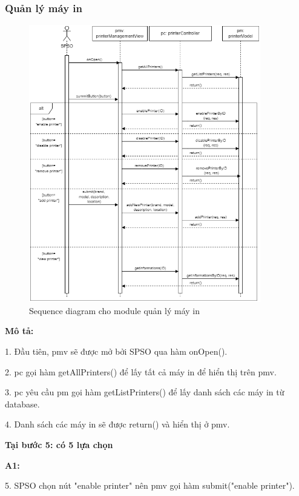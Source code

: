 \subsubsection{Quản lý máy in}
\begin{figure}[H]
    \begin{center}
        \includegraphics[width=0.9\textwidth]{Images/System Modelling/PM_Sequence.png}
        \caption{Sequence diagram cho module quản lý máy in}
        \label{fig:arch}
    \end{center}
\end{figure}
\textbf{Mô tả:}\par
1. Đầu tiên, pmv sẽ được mở bởi SPSO qua hàm onOpen().\par
2. pc gọi hàm getAllPrinters() để lấy tất cả máy in để hiển thị trên pmv. \par
3. pc yêu cầu pm gọi hàm getListPrinters() để lấy danh sách các máy in từ database. \par
4. Danh sách các máy in sẽ được return() và hiển thị ở pmv. \par
\textbf{Tại bước 5: có 5 lựa chọn}\par
\textbf{A1:}\par
5. SPSO chọn nút "enable printer" nên pmv gọi hàm submit("enable printer").\par
